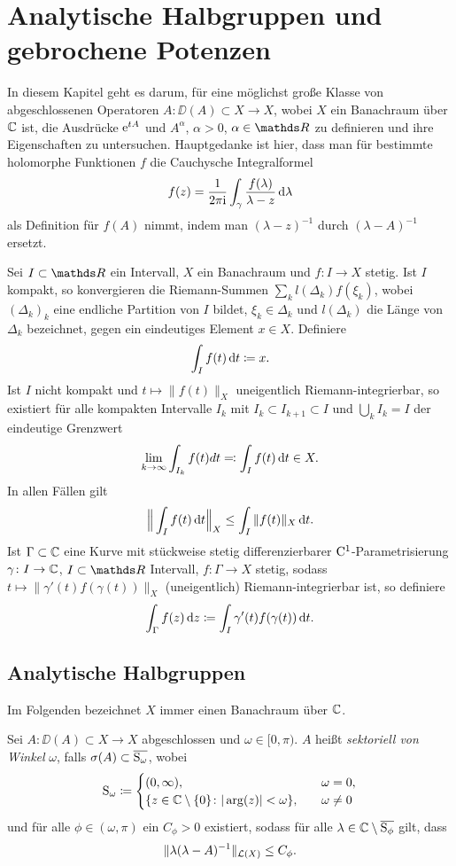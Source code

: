 \chapter{Analytische Halbgruppen und gebrochene Potenzen}

In diesem Kapitel geht es darum, für eine möglichst große Klasse von abgeschlossenen Operatoren $A \colon \DD(A) \subset X \to X$, wobei $X$ ein Banachraum über $\mathbb{C}$ ist, die Ausdrücke $\mathrm{e}^{tA}$ und $A^\alpha$, $\alpha > 0$, $\alpha \in \R$ zu definieren und ihre Eigenschaften zu untersuchen.
Hauptgedanke ist hier, dass man für bestimmte holomorphe Funktionen $f$ die Cauchysche Integralformel
$$
f(z) = \frac{1}{2\pi \mathrm{i}} \int_\gamma \frac{f(\lambda)}{\lambda - z} \, {\operatorname{d}\!{\lambda}}
$$
als Definition für $f(A)$ nimmt, indem man $(\lambda - z)^{-1}$ durch $(\lambda - A)^{-1}$ ersetzt.

Sei $I \subset \R$ ein Intervall, $X$ ein Banachraum und $f \colon I \to X$ stetig.
Ist $I$ kompakt, so konvergieren die Riemann-Summen $\sum_k l(\Delta_k) f(\xi_k)$, wobei $(\Delta_k)_k$ eine endliche Partition von $I$ bildet, $\xi_k \in \Delta_k$ und $l(\Delta_k)$ die Länge von $\Delta_k$ bezeichnet, gegen ein eindeutiges Element $x \in X$.
Definiere
$$
\int_I f(t) \, {\operatorname{d}\!{t}} \coloneqq x.
$$
Ist $I$ nicht kompakt und $t \mapsto \|f(t)\|_X$ uneigentlich Riemann-integrierbar, so existiert für alle kompakten Intervalle $I_k$ mit $I_k \subset I_{k + 1} \subset I$ und $\bigcup_k I_k = I$ der eindeutige Grenzwert
$$
\lim_{k \to \infty} \int_{I_k} f(t) dt \eqqcolon \int_I f(t) \, {\operatorname{d}\!{t}} \in X.
$$
In allen Fällen gilt
$$
\Big\| \int_I f(t) \, {\operatorname{d}\!{t}} \Big\|_X \leq \int_I \|f(t) \|_X \, {\operatorname{d}\!{t}}.
$$
Ist $\Gamma \subset \mathbb{C}$ eine Kurve mit stückweise stetig differenzierbarer $\mathrm{C}^1$-Parametrisierung $\gamma \colon I \to \mathbb{C}$, $I \subset \R$ Intervall, $f \colon \Gamma \to X$ stetig, sodass $t \mapsto \|\gamma'(t) f(\gamma(t)) \|_X$ (uneigentlich) Riemann-integrierbar ist, so definiere
$$
\int_\Gamma f(z) \, {\operatorname{d}\!{z}} \coloneqq \int_I \gamma'(t) f(\gamma(t)) \, {\operatorname{d}\!{t}}.
$$

\section{Analytische Halbgruppen}

Im Folgenden bezeichnet $X$ immer einen Banachraum über $\mathbb{C}$.

\begin{defn}
  Sei $A \colon \DD(A) \subset X \to X$ abgeschlossen und $\omega \in [0,\pi)$.
    $A$ heißt \emph{sektoriell von Winkel} $\omega$, falls $\sigma(A) \subset \overline{\mathrm{S}_\omega}$, wobei
    $$
    \mathrm{S}_\omega \coloneqq \begin{cases} (0,\infty), \quad&\omega = 0, \\ \{z \in \mathbb{C} \setminus\{0\} \colon |\arg(z)| < \omega\}, \quad&\omega \neq 0 \end{cases}
    $$
    und für alle $\phi \in (\omega, \pi)$ ein $C_\phi > 0$ existiert, sodass für alle $\lambda \in \mathbb{C} \setminus \overline{\mathrm{S}_\phi}$ gilt, dass
    $$
    \|\lambda(\lambda - A)^{-1}\|_{\mathcal{L}(X)} \leq C_\phi.
    $$
\end{defn}

